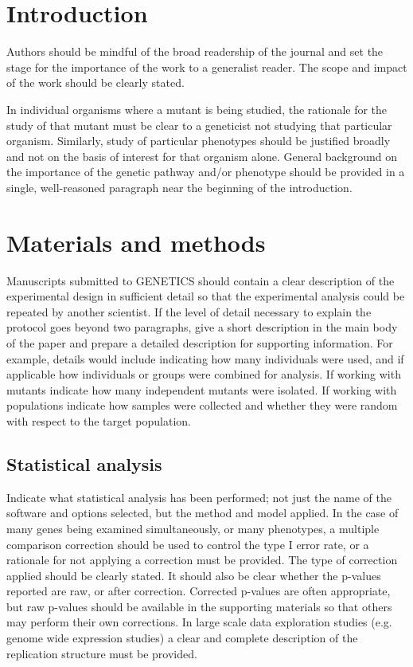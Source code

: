 \documentclass[9pt,twocolumn,twoside,lineno]{gsajnl}
\begin{document}
\section{Introduction}

Authors should be mindful of the broad readership of the journal and set the stage for the importance of the work to a generalist reader. The scope and impact of the work should be clearly stated.

In individual organisms where a mutant is being studied, the rationale for the study of that mutant must be clear to a geneticist not studying that particular organism. Similarly, study of particular phenotypes should be justified broadly and not on the basis of interest for that organism alone. General background on the importance of the genetic pathway and/or phenotype should be provided in a single, well-reasoned paragraph near the beginning of the introduction.

\section{Materials and methods}
\label{sec:materials:methods}

Manuscripts submitted to GENETICS should contain a clear description of the experimental design in sufficient detail so that the experimental analysis could be repeated by another scientist. If the level of detail necessary to explain the protocol goes beyond two paragraphs, give a short description in the main body of the paper and prepare a detailed description for supporting information.  For example, details would include indicating how many individuals were used, and if applicable how individuals or groups were combined for analysis. If working with mutants indicate how many independent mutants were isolated. If working with populations indicate how samples were collected and whether they were random with respect to the target population.


\subsection{Statistical analysis}

Indicate what statistical analysis has been performed; not just the name of the software and options selected, but the method and model applied. In the case of many genes being examined simultaneously, or many phenotypes, a multiple comparison correction should be used to control the type I error rate, or a rationale for not applying a correction must be provided. The type of correction applied should be clearly stated. It should also be clear whether the p-values reported are raw, or after correction. Corrected p-values are often appropriate, but raw p-values should be available in the supporting materials so that others may perform their own corrections. In large scale data exploration studies (e.g. genome wide expression studies) a clear and complete description of the replication structure must be provided.
\end{document}
